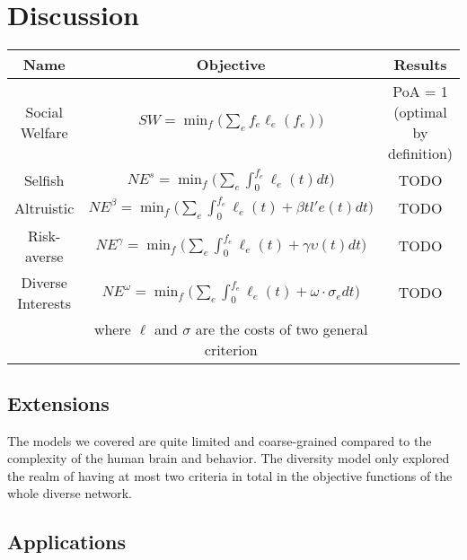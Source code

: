 \section{Discussion}\label{sec:discussion}

\begin{table}[h]
\begin{center}
 \begin{tabular}{|c | c | c|} 
 \hline
 Name & Objective & Results \\
 \hline\hline
     Social Welfare & $SW = \min_f\Big(\sum_e f_e\ell_e(f_e)\Big)$ & PoA = 1 (optimal by definition) \\
 \hline
     Selfish & $NE^s = \min_f\Big(\sum_e\int_0^{f_e} \ell_e(t)dt\Big)$ & TODO\\
 \hline
     Altruistic & $NE^\beta = \min_f\Big(\sum_e\int_0^{f_e} \ell_e(t) + \beta tl'e(t)dt\Big)$ & TODO\\
\hline
     Risk-averse & $NE^\gamma = \min_f\Big(\sum_e\int_0^{f_e} \ell_e(t) + \gamma\upsilon(t)dt\Big)$ & TODO\\
\hline
     Diverse Interests & $NE^\omega = \min_f\Big(\sum_e\int_0^{f_e} \ell_e(t) + \omega\cdot \sigma_e dt\Big)$ & TODO\\
     & where $\ell$ and $\sigma$ are the costs of two general criterion &\\
\hline
\end{tabular}
\end{center}
\end{table}

\subsection{Extensions}

The models we covered are quite limited and coarse-grained compared to the complexity of the human brain and behavior. The diversity model only explored the realm of having at most two criteria in total in the objective functions of the whole diverse network.


\subsection{Applications}


